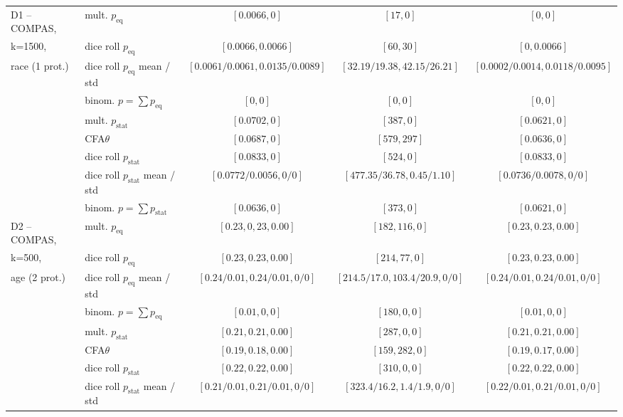 \begin{table}[t!]
{\begin{tabular}{llccc}
			\midrule
			\midrule
			D1 -- COMPAS,	& mult. \algoFAIR $p_{\text{eq}}$ 	& $[0.0066, 0]$ & $[17, 0]$ 	& $[0, 0]$ \\
			k=1500, 		& dice roll $p_{\text{eq}}$ 	& $[0.0066, 0.0066]$ & $[60, 30]$ 	& $[0, 0.0066]$ \\
			race (1 prot.)	& dice roll $p_{\text{eq}}$ mean / std	& $[0.0061 / 0.0061, 0.0135 / 0.0089]$ & $[32.19 / 19.38, 42.15 / 26.21]$ 	& $[0.0002 / 0.0014, 0.0118 / 0.0095]$ \\
			& binom. \algoFAIR
			$p=\sum p_{\text{eq}}$ 	& $[0, 0]$ & $[0, 0]$ 	& $[0,0]$ \\
			\cline{2-5}
			& mult. \algoFAIR  $p_{\text{stat}}$ 	& $[0.0702, 0]$ & $[387, 0]$ 	& $[0.0621,0]$ \\
			& CFA$\theta$ 					& $[0.0687, 0]$ & $[579, 297]$ 	& $[0.0636, 0]$ \\
			& dice roll $p_{\text{stat}}$ 	& $[0.0833, 0]$ & $[524, 0]$ 	& $[0.0833, 0]$ \\
			& dice roll $p_{\text{stat}}$ mean / std	& $[0.0772 / 0.0056, 0 / 0]$ & $[477.35 / 36.78, 0.45 / 1.10]$ 	& $[0.0736 / 0.0078, 0 / 0]$ \\
			& binom. \algoFAIR
			$p=\sum p_{\text{stat}}$ 	& $[0.0636, 0]$ & $[373, 0]$ 	& $[0.0621,0]$ \\
			\midrule
			\midrule
			D2 -- COMPAS, 	& mult. \algoFAIR $p_{\text{eq}}$ 	& $[0.23, 0,23, 0.00]$ & $[182, 116, 0]$ 	& $[0.23, 0.23, 0.00]$ \\
			k=500, 			& dice roll $p_{\text{eq}}$ 	& $[0.23, 0.23, 0.00]$ & $[214, 77, 0]$ 	& $[0.23, 0.23, 0.00]$ \\
			age (2 prot.)	& dice roll $p_{\text{eq}}$ mean / std	& $[0.24 / 0.01, 0.24 / 0.01, 0 / 0]$ & $[214.5 / 17.0, 103.4 / 20.9, 0 / 0]$ 	& $[0.24 / 0.01, 0.24 / 0.01, 0 / 0]$ \\
			& binom. \algoFAIR $p = \sum p_{\text{eq}}$	& $[0.01,0,0]$	& $[180,0,0]$		& $[0.01,0,0]$  \\
			\cline{2-5}
			& mult. \algoFAIR $p_{\text{stat}}$ 	& $[0.21, 0.21, 0.00]$ & $[287, 0, 0]$ 		& $[0.21, 0.21, 0.00]$ \\
			& CFA$\theta$ 					& $[0.19, 0.18 ,0.00]$ & $[159, 282, 0]$ 	& $[0.19, 0.17, 0.00]$ \\ %
			& dice roll $p_{\text{stat}}$ 	& $[0.22, 0.22, 0.00]$ & $[310, 0, 0]$ 		& $[0.22, 0.22, 0.00]$ \\
			& dice roll $p_{\text{stat}}$ mean / std	& $[0.21 / 0.01, 0.21 / 0.01, 0 / 0]$ & $[323.4 / 16.2, 1.4 / 1.9, 0 / 0]$ 		& $[0.22 / 0.01, 0.21 / 0.01, 0 / 0]$ \\

\end{tabular}}
\end{table}
